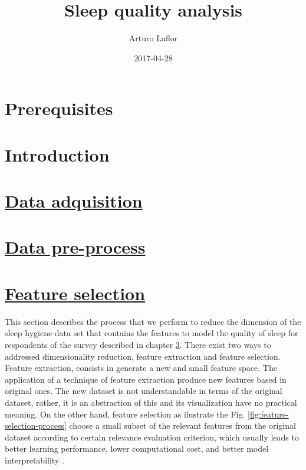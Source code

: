 \documentclass[]{book}
\title{Sleep quality analysis}
\author{Arturo Laflor}
\date{2017-04-28}
\begin{document}
\maketitle

{
\setcounter{tocdepth}{1}
\tableofcontents
}
\chapter{Prerequisites}\label{prerequisites}

\chapter{Introduction}\label{intro}

\hypertarget{data-adquisition}{\chapter{\texorpdfstring{\protect\hyperlink{data-adquisition}{Data
adquisition}}{Data adquisition}}\label{data-adquisition}}

\chapter{\texorpdfstring{\protect\hyperlink{data-preprocess}{Data
pre-process}}{Data pre-process}}\label{data-pre-process}

\hypertarget{feature-selection}{\chapter{\texorpdfstring{\protect\hyperlink{feature-selection}{Feature
selection}}{Feature selection}}\label{feature-selection}}

This section describes the process that we perform to reduce the
dimension of the sleep hygiene data set that contains the features to
model the quality of sleep for respondents of the survey described in
chapter \ref{data-adquisition}. There exist two ways to addressed
dimensionality reduction, feature extraction and feature selection.
Feature extraction, consists in generate a new and small feature space.
The application of a technique of feature extraction produce new
features based in original ones. The new dataset is not understandable
in terms of the original dataset, rather, it is an abstraction of this
and its visualization have no practical meaning. On the other hand,
feature selection as ilustrate the Fig.
\ref{fig:feature-selection-process} choose a small subset of the
relevant features from the original dataset according to certain
relevance evaluation criterion, which usually leads to better learning
performance, lower computational cost, and better model interpretability
\citep{Tang2014}.
\end{document}

